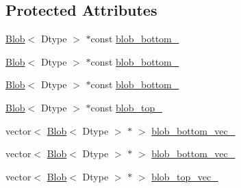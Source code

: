 \subsection*{Protected Attributes}
\begin{DoxyCompactItemize}
\item 
\hyperlink{classcaffe_1_1_blob}{Blob}$<$ Dtype $>$ $\ast$const \hyperlink{classcaffe_1_1_concat_layer_test_a2aeb1f380b300d1adf464e5a9c7374bc}{blob\+\_\+bottom\+\_}
\item 
\hyperlink{classcaffe_1_1_blob}{Blob}$<$ Dtype $>$ $\ast$const \hyperlink{classcaffe_1_1_concat_layer_test_a243aef5df87eadba613ca2b28c1b417b}{blob\+\_\+bottom\+\_}
\item 
\hyperlink{classcaffe_1_1_blob}{Blob}$<$ Dtype $>$ $\ast$const \hyperlink{classcaffe_1_1_concat_layer_test_ac1adcb4ac23846de69e5225810b74c73}{blob\+\_\+bottom\+\_}
\item 
\hyperlink{classcaffe_1_1_blob}{Blob}$<$ Dtype $>$ $\ast$const \hyperlink{classcaffe_1_1_concat_layer_test_ab04bb1208c677cf82e91534a897dec55}{blob\+\_\+top\+\_\+}
\item 
vector$<$ \hyperlink{classcaffe_1_1_blob}{Blob}$<$ Dtype $>$ $\ast$ $>$ \hyperlink{classcaffe_1_1_concat_layer_test_ad3d6992cf390bf791af61831658daaec}{blob\+\_\+bottom\+\_\+vec\+\_}
\item 
vector$<$ \hyperlink{classcaffe_1_1_blob}{Blob}$<$ Dtype $>$ $\ast$ $>$ \hyperlink{classcaffe_1_1_concat_layer_test_aa5a6e553646415c58ff0457c66d60a0d}{blob\+\_\+bottom\+\_\+vec\+\_}
\item 
vector$<$ \hyperlink{classcaffe_1_1_blob}{Blob}$<$ Dtype $>$ $\ast$ $>$ \hyperlink{classcaffe_1_1_concat_layer_test_ae891c1b8f80cebc4db0c50b2a8e958db}{blob\+\_\+top\+\_\+vec\+\_\+}
\end{DoxyCompactItemize}


